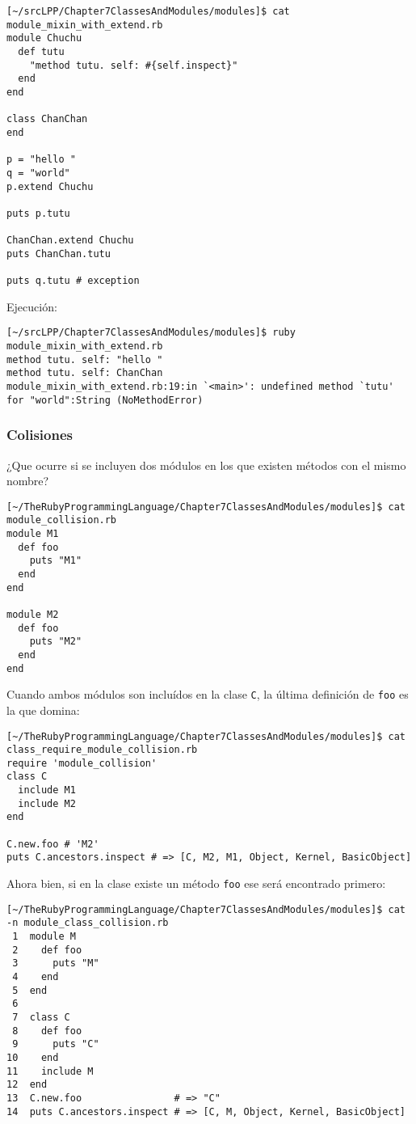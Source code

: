 \begin{verbatim}
[~/srcLPP/Chapter7ClassesAndModules/modules]$ cat module_mixin_with_extend.rb 
module Chuchu
  def tutu
    "method tutu. self: #{self.inspect}"
  end
end

class ChanChan
end

p = "hello "
q = "world"
p.extend Chuchu

puts p.tutu

ChanChan.extend Chuchu
puts ChanChan.tutu

puts q.tutu # exception
\end{verbatim}
Ejecución:
\begin{verbatim}
[~/srcLPP/Chapter7ClassesAndModules/modules]$ ruby module_mixin_with_extend.rb 
method tutu. self: "hello "
method tutu. self: ChanChan
module_mixin_with_extend.rb:19:in `<main>': undefined method `tutu' for "world":String (NoMethodError)
\end{verbatim}

\subsubsection{Colisiones}
\label{subsection:colisiones}
¿Que ocurre si se incluyen dos módulos en los que existen métodos con el mismo nombre?
\begin{verbatim}
[~/TheRubyProgrammingLanguage/Chapter7ClassesAndModules/modules]$ cat module_collision.rb 
module M1
  def foo
    puts "M1"
  end
end

module M2
  def foo
    puts "M2"
  end
end
\end{verbatim}

Cuando ambos módulos son incluídos en la clase \verb|C|, la última definición de \verb|foo| es la que 
domina:
\begin{verbatim}
[~/TheRubyProgrammingLanguage/Chapter7ClassesAndModules/modules]$ cat class_require_module_collision.rb 
require 'module_collision'
class C
  include M1
  include M2
end

C.new.foo # 'M2'
puts C.ancestors.inspect # => [C, M2, M1, Object, Kernel, BasicObject]
\end{verbatim}

Ahora bien, si en la clase existe un método \verb|foo| ese será encontrado primero:
\begin{verbatim}
[~/TheRubyProgrammingLanguage/Chapter7ClassesAndModules/modules]$ cat -n module_class_collision.rb 
 1  module M
 2    def foo
 3      puts "M"
 4    end
 5  end
 6  
 7  class C
 8    def foo
 9      puts "C"
10    end
11    include M
12  end
13  C.new.foo                # => "C"
14  puts C.ancestors.inspect # => [C, M, Object, Kernel, BasicObject]
\end{verbatim}

